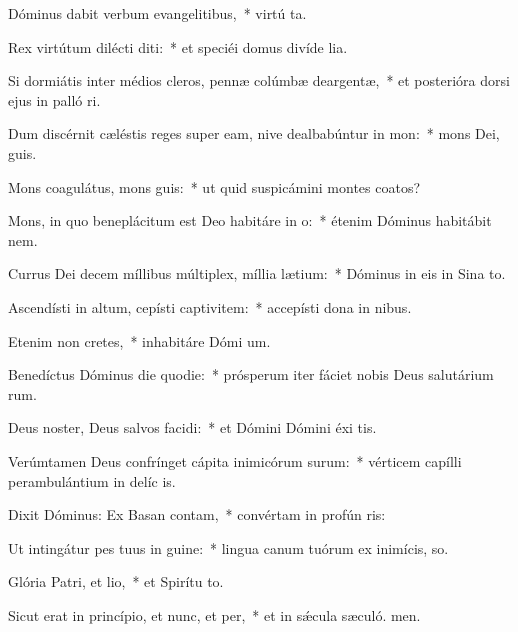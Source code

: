 \item Dóminus dabit verbum evangelitibus,~* virtú ta.
\item Rex virtútum dilécti diti:~* et speciéi domus divíde lia.
\item Si dormiátis inter médios cleros, pennæ colúmbæ deargentæ,~* et posterióra dorsi ejus in palló ri.
\item Dum discérnit cæléstis reges super eam, nive dealbabúntur in mon:~* mons Dei,  guis.
\item Mons coagulátus, mons guis:~* ut quid suspicámini montes coatos?
\item Mons, in quo beneplácitum est Deo habitáre in o:~* étenim Dóminus habitábit  nem.
\item Currus Dei decem míllibus múltiplex, míllia lætium:~* Dóminus in eis in Sina  to.
\item Ascendísti in altum, cepísti captivitem:~* accepísti dona in nibus.
\item Etenim non cretes,~* inhabitáre Dómi um.
\item Benedíctus Dóminus die quodie:~* prósperum iter fáciet nobis Deus salutárium rum.
\item Deus noster, Deus salvos facidi:~* et Dómini Dómini éxi tis.
\item Verúmtamen Deus confrínget cápita inimicórum surum:~* vérticem capílli perambulántium in delíc is.
\item Dixit Dóminus: Ex Basan contam,~* convértam in profún ris:
\item Ut intingátur pes tuus in guine:~* lingua canum tuórum ex inimícis,  so.
\item Glória Patri, et lio,~* et Spirítu to.
\item Sicut erat in princípio, et nunc, et per,~* et in sǽcula sæculó. men.
